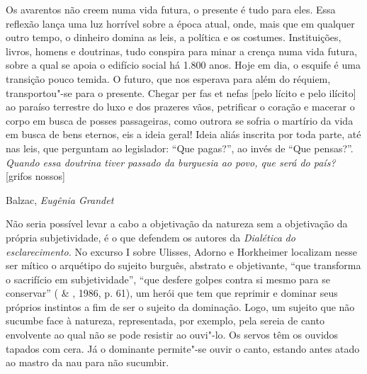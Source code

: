 \epigraph{Os avarentos não creem numa vida futura, o presente é tudo para eles.
Essa reflexão lança uma luz horrível sobre a época atual, onde, mais que
em qualquer outro tempo, o dinheiro domina as leis, a política e os
costumes. Instituições, livros, homens e doutrinas, tudo conspira para
minar a crença numa vida futura, sobre a qual se apoia o edifício social
há 1.800 anos. Hoje em dia, o esquife é uma transição pouco temida. O
futuro, que nos esperava para além do réquiem, transportou"-se para o
presente. Chegar per fas et nefas [pelo lícito e pelo ilícito] ao
paraíso terrestre do luxo e dos prazeres vãos, petrificar o coração e
macerar o corpo em busca de posses passageiras, como outrora se sofria o
martírio da vida em busca de bens eternos, eis a ideia geral! Ideia
aliás inscrita por toda parte, até nas leis, que perguntam ao
legislador: ``Que pagas?'', ao invés de ``Que pensas?''. \emph{Quando
essa doutrina tiver passado da burguesia ao povo, que será do país?}
[grifos nossos]}{Balzac, \emph{Eugênia Grandet}}

Não seria possível levar a cabo a objetivação da natureza sem a
objetivação da própria subjetividade, é o que defendem os autores da
\emph{Dialética} \emph{do} \emph{esclarecimento.} No excurso I sobre
Ulisses, Adorno e Horkheimer localizam nesse ser mítico o arquétipo do
sujeito burguês, abstrato e objetivante, ``que transforma o sacrifício
em subjetividade'', ``que desfere golpes contra si mesmo para se
conservar'' ( \& , 1986, p. 61), um herói que tem que
reprimir e dominar seus próprios instintos a fim de ser o sujeito da
dominação. Logo, um sujeito que não sucumbe face à natureza,
representada, por exemplo, pela sereia de canto envolvente ao qual não
se pode resistir ao ouvi"-lo. Os servos têm os ouvidos tapados com cera.
Já o dominante permite"-se ouvir o canto, estando antes atado ao mastro
da nau para não sucumbir.

